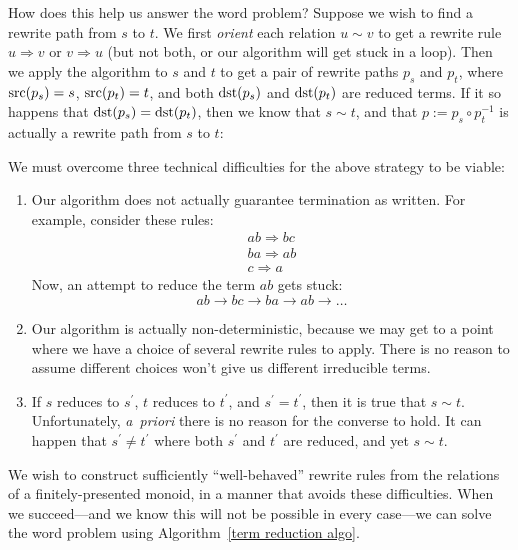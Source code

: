 \documentclass[../generics]{subfiles}
\begin{document}
How does this help us answer the word problem? Suppose we wish to find a rewrite path from $s$ to $t$. We first \emph{orient} each relation $u\sim v$ to get a rewrite rule $u\Rightarrow v$ or $v\Rightarrow u$ (but not both, or our algorithm will get stuck in a loop). Then we apply the algorithm to $s$ and $t$ to get a pair of rewrite paths $p_s$ and $p_t$, where $\operatorname{src}(p_s)=s$, $\operatorname{src}(p_t)=t$, and both $\operatorname{dst}(p_s)$ and $\operatorname{dst}(p_t)$ are reduced terms. If it so happens that $\operatorname{dst}(p_s)=\operatorname{dst}(p_t)$, then we know that $s\sim t$, and that $p:= p_s \circ p_t^{-1}$ is actually a rewrite path from $s$ to $t$:
\begin{quote}
\end{quote}
We must overcome three technical difficulties for the above strategy to be viable:
\begin{enumerate}
\item Our algorithm does not actually guarantee termination as written. For example, consider these rules:
\begin{gather*}
ab\Rightarrow bc\\
ba\Rightarrow ab\\
c\Rightarrow a
\end{gather*}
Now, an attempt to reduce the term $ab$ gets stuck:
\[ab\rightarrow bc\rightarrow ba\rightarrow ab\rightarrow\ldots\]

\item Our algorithm is actually non-deterministic, because we may get to a point where we have a choice of several rewrite rules to apply. There is no reason to assume different choices won't give us different irreducible terms.

\item If $s$ reduces to $s^\prime$, $t$ reduces to $t^\prime$, and $s^\prime=t^\prime$, then it is true that $s\sim t$. Unfortunately, \emph{a~priori} there is no reason for the converse to hold. It can happen that $s^\prime\neq t^\prime$ where both $s^\prime$ and $t^\prime$ are reduced, and yet $s\sim t$.

\end{enumerate}

We wish to construct sufficiently ``well-behaved'' rewrite rules from the relations of a finitely-presented monoid, in a manner that avoids these difficulties. When we succeed---and we know this will not be possible in every case---we can solve the word problem using Algorithm~\ref{term reduction algo}.
\end{document}
